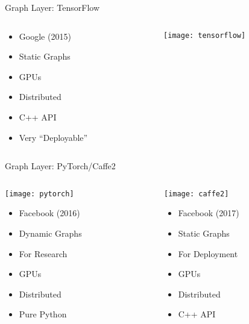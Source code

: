 
\begin{slide}{Graph Layer: TensorFlow}
  \pause
  \begin{columns}
    \begin{column}{0.5\textwidth}
      \begin{itemize}
        \item Google (2015)
        \item Static Graphs
        \item GPUs \cmark
        \item Distributed \cmark
        \item C++ API \xmark
        \item Very ``Deployable''
      \end{itemize}
    \end{column}
    \begin{column}{0.5\textwidth}
      \texttt{[image: tensorflow]}
    \end{column}
  \end{columns}
\end{slide}

\begin{slide}{Graph Layer: PyTorch/Caffe2}
  \begin{columns}
    \begin{column}{0.5\textwidth}
      \centering
      \hspace{-1.2cm}\texttt{[image: pytorch]}
      \vspace{0.2cm}

      \begin{itemize}
        \item Facebook (2016)
        \item Dynamic Graphs
        \item For Research
        \item GPUs \cmark
        \item Distributed \cmark
        \item Pure Python
      \end{itemize}
    \end{column}
    \begin{column}{0.5\textwidth}
      \centering
      \hspace{-1.2cm}\texttt{[image: caffe2]}
      \vspace{0.2cm}

      \begin{itemize}
        \item Facebook (2017)
        \item Static Graphs
        \item For Deployment
        \item GPUs \cmark
        \item Distributed \cmark
        \item C++ API \cmark
      \end{itemize}
    \end{column}
  \end{columns}
\end{slide}

